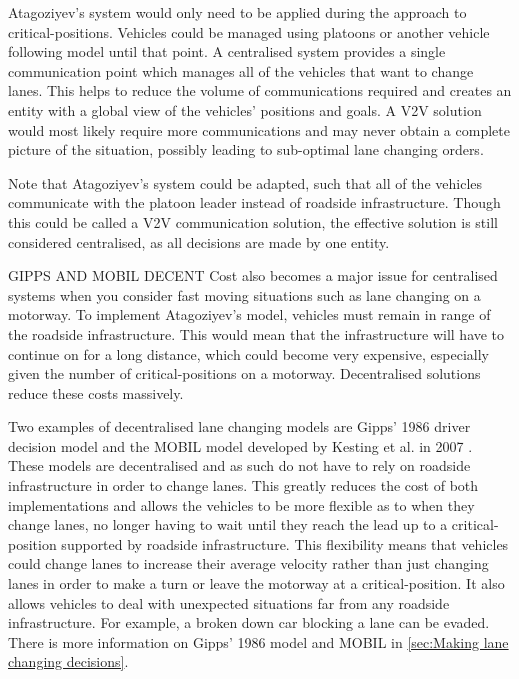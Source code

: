 Atagoziyev's system would only need to be applied during the approach to critical-positions. Vehicles could be managed using platoons or another vehicle following model until that point. A centralised system provides a single communication point which manages all of the vehicles that want to change lanes. This helps to reduce the volume of communications required and creates an entity with a global view of the vehicles' positions and goals. A V2V solution would most likely require more communications and may never obtain a complete picture of the situation, possibly leading to sub-optimal lane changing orders.

Note that Atagoziyev's system could be adapted, such that all of the vehicles communicate with the platoon leader instead of roadside infrastructure. Though this could be called a V2V communication solution, the effective solution is still considered centralised, as all decisions are made by one entity.

GIPPS AND MOBIL DECENT
Cost also becomes a major issue for centralised systems when you consider fast moving situations such as lane changing on a motorway. To implement Atagoziyev's model, vehicles must remain in range of the roadside infrastructure. This would mean that the infrastructure will have to continue on for a long distance, which could become very expensive, especially given the number of critical-positions on a motorway. Decentralised solutions reduce these costs massively.

Two examples of decentralised lane changing models are Gipps' 1986 driver decision model \citep{Gipps1986} and the MOBIL model developed by Kesting et al. in 2007 \citep{Kesting2007}. These models are decentralised and as such do not have to rely on roadside infrastructure in order to change lanes. This greatly reduces the cost of both implementations and allows the vehicles to be more flexible as to when they change lanes, no longer having to wait until they reach the lead up to a critical-position supported by roadside infrastructure. This flexibility means that vehicles could change lanes to increase their average velocity rather than just changing lanes in order to make a turn or leave the motorway at a critical-position. It also allows vehicles to deal with unexpected situations far from any roadside infrastructure. For example, a broken down car blocking a lane can be evaded. There is more information on Gipps' 1986 model and MOBIL in \ref{sec:Making lane changing decisions}.